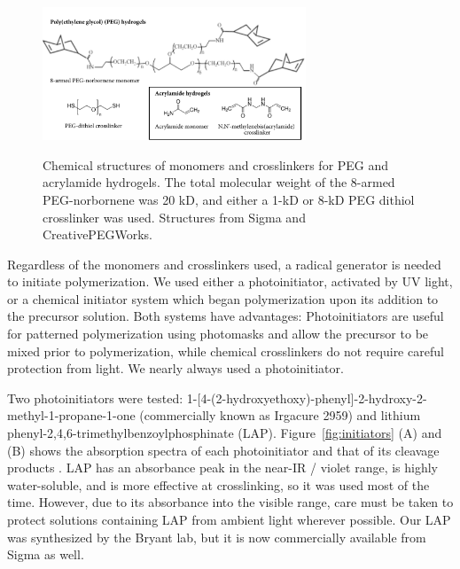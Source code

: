 \begin{figure}
\caption[Monomers and crosslinkers for PEG and acrylamide hydrogels.]{Chemical structures of monomers and crosslinkers for PEG and acrylamide hydrogels. The total molecular weight of the 8-armed PEG-norbornene was 20 kD, and either a 1-kD or 8-kD PEG dithiol crosslinker was used.  Structures from Sigma and CreativePEGWorks.}
\centering
\includegraphics[width=0.7\textwidth]{figs/ch03/monomer-and-crosslinker}
\label{fig:monomer-crosslinker}
\end{figure}

Regardless of the monomers and crosslinkers used, a radical generator is needed to initiate polymerization.  We used either a photoinitiator, activated by UV light, or a chemical initiator system which began polymerization upon its addition to the precursor solution.  Both systems have advantages: Photoinitiators are useful for patterned polymerization using photomasks and allow the precursor to be mixed prior to polymerization, while chemical crosslinkers do not require careful protection from light.  We nearly always used a photoinitiator.

Two photoinitiators were tested: 1-[4-(2-hydroxyethoxy)-phenyl]-2-hydroxy-2-methyl-1-propane-1-one (commercially known as Irgacure 2959) and lithium phenyl-2,4,6-trimethylbenzoylphosphinate (LAP). %
Figure~\ref{fig:initiators} (A) and (B) shows the absorption spectra of each photoinitiator and that of its cleavage products \cite{fairbanks09}.  LAP has an absorbance peak in the near-IR / violet range, is highly water-soluble, and is more effective at crosslinking, so it was used most of the time.  However, due to its absorbance into the visible range, care must be taken to protect solutions containing LAP from ambient light wherever possible.  Our LAP was synthesized by the Bryant lab, but it is now commercially available from Sigma as well.

